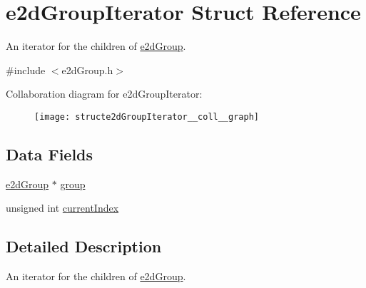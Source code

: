 \hypertarget{structe2dGroupIterator}{\section{e2d\-Group\-Iterator Struct Reference}
\label{structe2dGroupIterator}
}


An iterator for the children of \hyperlink{structe2dGroup}{e2d\-Group}.  




{\ttfamily \#include $<$e2d\-Group.\-h$>$}



Collaboration diagram for e2d\-Group\-Iterator\-:\nopagebreak
\begin{figure}[H]
\begin{center}
\leavevmode
\texttt{[image: structe2dGroupIterator\_\_coll\_\_graph]}
\end{center}
\end{figure}
\subsection*{Data Fields}
\begin{DoxyCompactItemize}
\item 
\hyperlink{structe2dGroup}{e2d\-Group} $\ast$ \hyperlink{structe2dGroupIterator_a13e9c2162587f7af49d2ceb78c380444}{group}
\item 
unsigned int \hyperlink{structe2dGroupIterator_a932f59c8e81a171eb21af8d204d1c13d}{current\-Index}
\end{DoxyCompactItemize}


\subsection{Detailed Description}
An iterator for the children of \hyperlink{structe2dGroup}{e2d\-Group}. 

